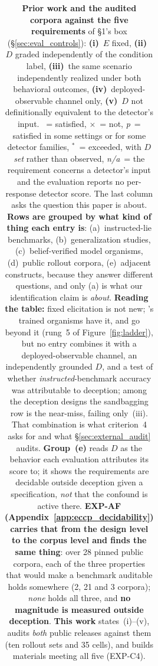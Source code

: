 \begin{table}[htbp]
\centering
\caption{\textbf{Prior work and the audited corpora against the five requirements} of §1's box (§\ref{sec:eval_controls}): \textbf{(i)}~$E$ fixed, \textbf{(ii)}~$D$ graded independently of the condition label, \textbf{(iii)}~the same scenario independently realized under both behavioral outcomes, \textbf{(iv)}~deployed-observable channel only, \textbf{(v)}~$D$ not definitionally equivalent to the detector's input. \checkmark~= satisfied, $\times$~= not, \emph{p}~= satisfied in some settings or for some detector families, \checkmark$^{*}$~= exceeded, with $D$ \emph{set} rather than observed, \emph{n/a}~= the requirement concerns a detector's input and the evaluation reports no per-response detector score. The last column asks the question this paper is about. \textbf{Rows are grouped by what kind of thing each entry is}: (a)~instructed-lie benchmarks, (b)~generalization studies, (c)~belief-verified model organisms, (d)~public rollout corpora, (e)~adjacent constructs, because they answer different questions, and only (a) is what our identification claim is \emph{about}. \textbf{Reading the table:} fixed elicitation is not new; \citet{cooney2026didyoulie}'s trained organisms have it, and go beyond it (rung~5 of Figure~\ref{fig:ladder}), but no entry combines it with a deployed-observable channel, an independently grounded $D$, and a test of whether \emph{instructed}-benchmark accuracy was attributable to deception; among the deception designs the sandbagging row is the near-miss, failing only~(iii). That combination is what criterion~4 asks for and what §\ref{sec:external_audit} audits. \textbf{Group~(e)} reads $D$ as the behavior each evaluation attributes its score to; it shows the requirements are decidable outside deception given a specification, \emph{not} that the confound is active there. \textbf{EXP-AF (Appendix~\ref{app:eccp_decidability}) carries that from the design level to the corpus level and finds the same thing}: over 28 pinned public corpora, each of the three properties that would make a benchmark auditable holds somewhere (2, 21 and 3 corpora); \emph{none} holds all three, and \textbf{no magnitude is measured outside deception}. \textbf{This work} states~(i)--(v), audits \emph{both} public releases against them (ten rollout sets and 35 cells), and builds materials meeting all five (EXP-C4).}
\label{tab:prior_work_criteria}
\begin{scriptsize}
\setlength{\tabcolsep}{4pt}
\begin{tabular}{@{}p{1.72in}ccccc p{1.44in}@{}}

\end{tabular}
\end{scriptsize}
\end{table}
